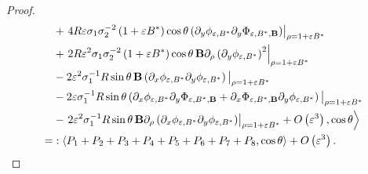 \documentclass[12pt,reqno]{amsart}
\numberwithin{equation}{section}
\theoremstyle{definition}
\theoremstyle{remark}
\begin{document}
\begin{proof}
\begin{align}
		& +\left.4 R \varepsilon \sigma_1 \sigma_2^{-2}\left(1+\varepsilon B^*\right) \cos \theta\left(\partial_y \phi_{\varepsilon, B^*}   \partial_y \Phi_{\varepsilon,   B^*, \textbf{B}}\right)\right|_{\rho=1+\varepsilon B^*} \notag\\
		& +\left.2 R \varepsilon^2 \sigma_1 \sigma_2^{-2}\left(1+\varepsilon B^*\right) \cos \theta\, \textbf{B}   \partial_\rho\left(\partial_y \phi_{\varepsilon, B^*}\right)^2\right|_{\rho=1+\varepsilon B^*} \notag\\
		& -2 \varepsilon^2 \sigma_1^{-1} R \sin \theta\, \textbf{B}\left(\partial_x \phi_{\varepsilon, B^*} \partial_y \phi_{\varepsilon, B^*}\right)\big|_{\rho=1+\varepsilon B^*} \notag\\
		& -2 \varepsilon \sigma_1^{-1} R \sin \theta\left(\partial_x \phi_{\varepsilon, B^*} \partial_y \Phi_{\varepsilon, B^*, \textbf{B}}+\partial_x \Phi_{\varepsilon,B^*, \textbf{B}} \partial_y \phi_{\varepsilon, B^*}\right)\big|_{\rho=1+ \varepsilon B^*} \notag\\
		& -\left.2 \varepsilon^2 \sigma_1^{-1} R \sin \theta\, \textbf{B} \partial_\rho\left(\partial_x \phi_{\varepsilon, B^*} \partial_y \phi_{\varepsilon, B^*}\right)\right|_{\rho=1+\varepsilon B^*} +O\left(\varepsilon^3\right), \cos \theta\Big\rangle \notag\\
		=&: \left\langle P_1+P_2+P_3+P_4+P_5+P_6+P_7+P_8, \cos \theta\right\rangle+O\left(\varepsilon^3\right) . 
\end{align}


\end{proof}
\end{document}
